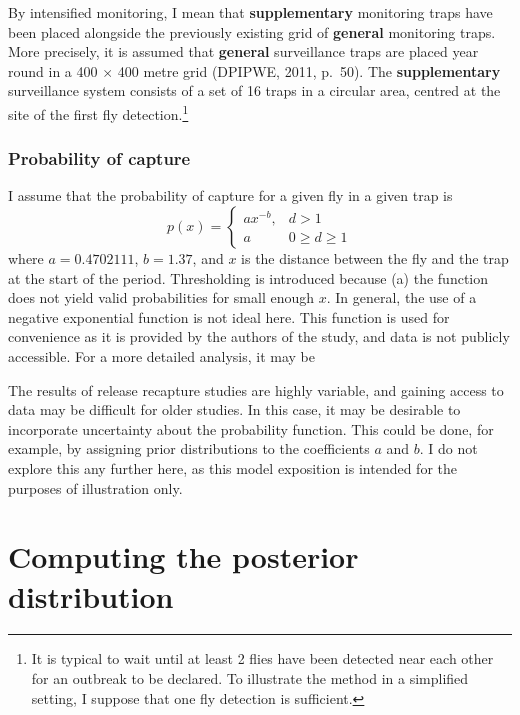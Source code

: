 \documentclass[
]{book}
\begin{document}
By intensified monitoring, I mean that \textbf{supplementary} monitoring traps have been placed alongside the previously existing grid of \textbf{general} monitoring traps. More precisely, it is assumed that \textbf{general} surveillance traps are placed year round in a 400 \(\times\) 400 metre grid (DPIPWE, 2011, p.~50). The \textbf{supplementary} surveillance system consists of a set of 16 traps in a circular area, centred at the site of the first fly detection.\footnote{It is typical to wait until at least 2 flies have been detected near each other for an outbreak to be declared. To illustrate the method in a simplified setting, I suppose that one fly detection is sufficient.}

\hypertarget{probability-of-capture}{%
\subsubsection{Probability of capture}\label{probability-of-capture}}

I assume that the probability of capture for a given fly in a given trap is
\[
p(x) = \begin{cases}ax^{-b}, & d>1 \\ a & 0 \geq d \geq 1\end{cases}
\]
where \(a = 0.4702111\), \(b = 1.37\), and \(x\) is the distance between the fly and the trap at the start of the period. Thresholding is introduced because (a) the function does not yield valid probabilities for small enough \(x\). In general, the use of a negative exponential function is not ideal here. This function is used for convenience as it is provided by the authors of the study, and data is not publicly accessible. For a more detailed analysis, it may be

The results of release recapture studies are highly variable, and gaining access to data may be difficult for older studies. In this case, it may be desirable to incorporate uncertainty about the probability function. This could be done, for example, by assigning prior distributions to the coefficients \(a\) and \(b\). I do not explore this any further here, as this model exposition is intended for the purposes of illustration only.

\hypertarget{computing-the-posterior-distribution}{%
\section{Computing the posterior distribution}\label{computing-the-posterior-distribution}}
\end{document}
